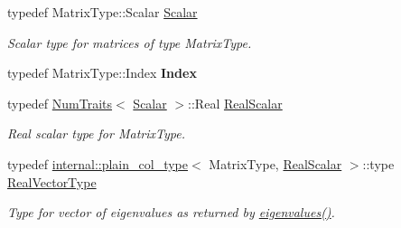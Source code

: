 \begin{DoxyCompactItemize}
\item 
\mbox{\label{class_eigen_1_1_arpack_generalized_self_adjoint_eigen_solver_ab1182405bfe87a505d4b7a8311c661ec}} 
typedef Matrix\+Type\+::\+Scalar \hyperlink{class_eigen_1_1_arpack_generalized_self_adjoint_eigen_solver_ab1182405bfe87a505d4b7a8311c661ec}{Scalar}
\begin{DoxyCompactList}\small\item\em Scalar type for matrices of type {\ttfamily Matrix\+Type}. \end{DoxyCompactList}\item 
\mbox{\label{class_eigen_1_1_arpack_generalized_self_adjoint_eigen_solver_a2593f8953630418bd5641086151610c1}} 
typedef Matrix\+Type\+::\+Index {\bfseries Index}
\item 
typedef \hyperlink{group___core___module_struct_eigen_1_1_num_traits}{Num\+Traits}$<$ \hyperlink{class_eigen_1_1_arpack_generalized_self_adjoint_eigen_solver_ab1182405bfe87a505d4b7a8311c661ec}{Scalar} $>$\+::Real \hyperlink{class_eigen_1_1_arpack_generalized_self_adjoint_eigen_solver_a2555af55e53bf9de894a49e639be2e1e}{Real\+Scalar}
\begin{DoxyCompactList}\small\item\em Real scalar type for {\ttfamily Matrix\+Type}. \end{DoxyCompactList}\item 
typedef \hyperlink{struct_eigen_1_1internal_1_1plain__col__type}{internal\+::plain\+\_\+col\+\_\+type}$<$ Matrix\+Type, \hyperlink{class_eigen_1_1_arpack_generalized_self_adjoint_eigen_solver_a2555af55e53bf9de894a49e639be2e1e}{Real\+Scalar} $>$\+::type \hyperlink{class_eigen_1_1_arpack_generalized_self_adjoint_eigen_solver_a47a5becb6dda25dbd90a1704a8247dd8}{Real\+Vector\+Type}
\begin{DoxyCompactList}\small\item\em Type for vector of eigenvalues as returned by \hyperlink{class_eigen_1_1_arpack_generalized_self_adjoint_eigen_solver_ab46900dafdd11a8ac05a662c6b41480d}{eigenvalues()}. \end{DoxyCompactList}\item 
\mbox{\label{class_eigen_1_1_arpack_generalized_self_adjoint_eigen_solver_ab1182405bfe87a505d4b7a8311c661ec}} 

\end{DoxyCompactItemize}
